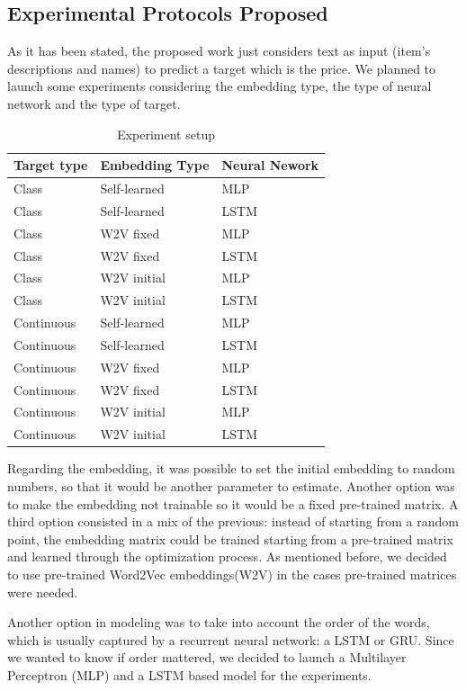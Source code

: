 \documentclass[11pt,letterpaper]{article}
\begin{document}
\subsection{Experimental Protocols Proposed}
As it has been stated, the proposed work just considers text as input (item's descriptions and names) to predict a target which is the price. We planned to launch some experiments considering the embedding type, the type of neural network and the type of target.
\begin{table}[ht!]
\centering
\caption{Experiment setup}
\label{table:experiment-setup}
\scalebox{0.8} 
{\begin{tabular}{|l|l|l|}
\hline
\textbf{Target type} & \textbf{Embedding Type} & \textbf{Neural Nework} \\ \hline \hline
Class & Self-learned & MLP \\ \hline
Class & Self-learned & LSTM \\ \hline
Class & W2V fixed & MLP \\ \hline
Class & W2V fixed & LSTM \\ \hline
Class & W2V initial & MLP \\ \hline
Class & W2V initial & LSTM \\ \hline
Continuous & Self-learned & MLP \\ \hline
Continuous & Self-learned & LSTM \\ \hline
Continuous & W2V fixed & MLP \\ \hline
Continuous & W2V fixed & LSTM \\ \hline
Continuous & W2V initial & MLP \\ \hline
Continuous & W2V initial & LSTM \\ \hline \hline
\end{tabular}}
\end{table}

Regarding the embedding, it was possible to set the initial embedding to random numbers, so that it would be another parameter to estimate. Another option was to make the embedding not trainable so it would be a fixed pre-trained matrix. A third option consisted in a mix of the previous: instead of starting from a random point, the embedding matrix could be trained starting from a pre-trained matrix and learned through the optimization process. As mentioned before, we decided to use pre-trained Word2Vec embeddings(W2V) in the cases pre-trained matrices were needed. 

Another option in modeling was to take into account the order of the words, which is usually captured by a recurrent neural network: a LSTM or GRU. Since we wanted to know if order mattered, we decided to launch a  Multilayer Perceptron (MLP) and a LSTM based model for the experiments. 
\end{document}
